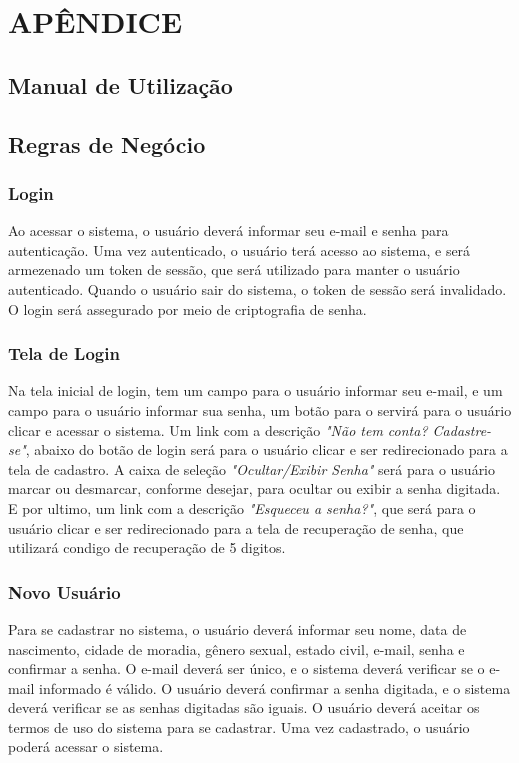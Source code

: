 \documentclass[../main.tex]{subfiles}
\begin{document}
\section{APÊNDICE}
\subsection{Manual de Utilização}
\subsection{Regras de Negócio}
\subsubsection{Login}
Ao acessar o sistema, o usuário deverá informar seu e-mail e senha para autenticação. Uma
vez autenticado, o usuário terá acesso ao sistema, e será armezenado um token de sessão,
que será utilizado para manter o usuário autenticado. Quando o usuário sair do sistema, o
token de sessão será invalidado. O login será assegurado por meio de criptografia de senha.
\subsubsection{Tela de Login}
Na tela inicial de login, tem um campo para o usuário informar seu e-mail, e um campo para 
o usuário informar sua senha, um botão para o servirá para o usuário clicar e acessar o 
sistema. Um link com a descrição \textit{"Não tem conta? Cadastre-se"}, abaixo do botão 
de login será para o usuário clicar e ser redirecionado para a tela de cadastro. A caixa 
de seleção \textit{"Ocultar/Exibir Senha"} será para o usuário marcar ou desmarcar, 
conforme desejar, para ocultar ou exibir a senha digitada. E por ultimo, um link com a
descrição \textit{"Esqueceu a senha?"}, que será para o usuário clicar e ser redirecionado
para a tela de recuperação de senha, que utilizará condigo de recuperação de 5 digitos.
\subsubsection{Novo Usuário}
Para se cadastrar no sistema, o usuário deverá informar seu nome, data de nascimento, 
cidade de moradia, gênero sexual, estado civil, e-mail, senha e confirmar a senha. 
O e-mail deverá ser único, e o sistema deverá verificar se o e-mail informado é válido. 
O usuário deverá confirmar a senha digitada, e o sistema deverá verificar se as senhas
digitadas são iguais. O usuário deverá aceitar os termos de uso do sistema para se 
cadastrar. Uma vez cadastrado, o usuário poderá acessar o sistema.
\end{document}

